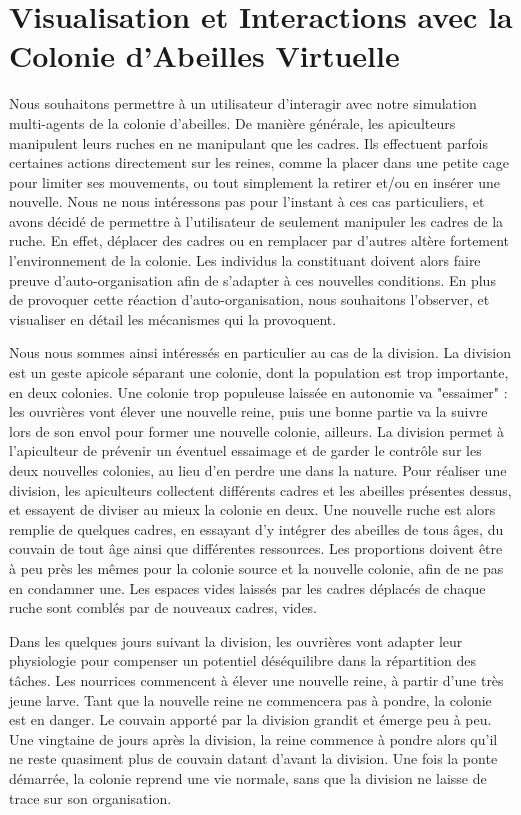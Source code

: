 \chapter{Visualisation et Interactions avec la Colonie d'Abeilles Virtuelle}
\label{ChapitrePropVR}

		Nous souhaitons permettre à un utilisateur d'interagir avec notre simulation multi-agents de la colonie d'abeilles. De manière générale, les apiculteurs manipulent leurs ruches en ne manipulant que les cadres. Ils effectuent parfois certaines actions directement sur les reines, comme la placer dans une petite cage pour limiter ses mouvements, ou tout simplement la retirer et/ou en insérer une nouvelle. Nous ne nous intéressons pas pour l'instant à ces cas particuliers, et avons décidé de permettre à l'utilisateur de seulement manipuler les cadres de la ruche. En effet, déplacer des cadres ou en remplacer par d'autres altère fortement l'environnement de la colonie. Les individus la constituant doivent alors faire preuve d'auto-organisation afin de s'adapter à ces nouvelles conditions. En plus de provoquer cette réaction d'auto-organisation, nous souhaitons l'observer, et visualiser en détail les mécanismes qui la provoquent.
		
		Nous nous sommes ainsi intéressés en particulier au cas de la division. La division est un geste apicole séparant une colonie, dont la population est trop importante, en deux colonies. Une colonie trop populeuse laissée en autonomie va "essaimer" : les ouvrières vont élever une nouvelle reine, puis une bonne partie va la suivre lors de son envol pour former une nouvelle colonie, ailleurs. La division permet à l'apiculteur de prévenir un éventuel essaimage et de garder le contrôle sur les deux nouvelles colonies, au lieu d'en perdre une dans la nature. Pour réaliser une division, les apiculteurs collectent différents cadres et les abeilles présentes dessus, et essayent de diviser au mieux la colonie en deux. Une nouvelle ruche est alors remplie de quelques cadres, en essayant d'y intégrer des abeilles de tous âges, du couvain de tout âge ainsi que différentes ressources. Les proportions doivent être à peu près les mêmes pour la colonie source et la nouvelle colonie, afin de ne pas en condamner une. Les espaces vides laissés par les cadres déplacés de chaque ruche sont comblés par de nouveaux cadres, vides.
		
		Dans les quelques jours suivant la division, les ouvrières vont adapter leur physiologie pour compenser un potentiel déséquilibre dans la répartition des tâches. Les nourrices commencent à élever une nouvelle reine, à partir d'une très jeune larve. Tant que la nouvelle reine ne commencera pas à pondre, la colonie est en danger. Le couvain apporté par la division grandit et émerge peu à peu. Une vingtaine de jours après la division, la reine commence à pondre alors qu'il ne reste quasiment plus de couvain datant d'avant la division. Une fois la ponte démarrée, la colonie reprend une vie normale, sans que la division ne laisse de trace sur son organisation.
		
